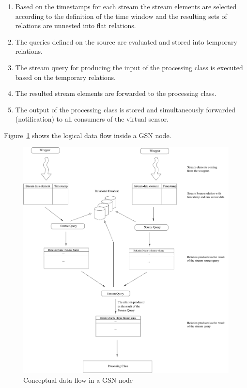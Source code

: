 \begin{enumerate}
\item Based on the timestamps for each stream the stream elements are
  selected according to the definition of the time window and the resulting
  sets of relations are unnested into flat relations.
\item The queries defined on the source are evaluated and stored into temporary
  relations.
\item The stream query for producing the input of the processing class is executed
  based on the temporary relations.
\item The resulted stream elements are forwarded to the processing class.
\item The output of the processing class is stored and simultaneously forwarded (notification) to
 all consumers of the virtual sensor.
\end{enumerate}

Figure~\ref{fig:ConceptualDataFlow} shows the logical data flow inside
a GSN node.

\begin{figure}%
  \centering
  \includegraphics[width=0.7\columnwidth]{ch-gsn-figures/conceptual-dataflow}
  \caption{Conceptual data flow in a GSN node}
  \label{fig:ConceptualDataFlow}
\end{figure}

